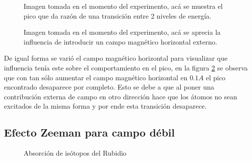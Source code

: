\documentclass[%
 reprint,
 amsmath,amssymb,
 aps,
]{revtex4-1}
\begin{document}
\begin{figure}[h]
\caption{\label{foto pico} Imagen tomada en el momento del experimento, acá se muestra el pico que da razón de una transición entre 2 niveles de energía.}
\end{figure}
\begin{figure}[h]
\caption{\label{foto muerto}  Imagen tomada en el momento del experimento, acá se aprecia la influencia de introducir un campo magnético horizontal externo.}
\end{figure}
De igual forma se varió el campo magnético horizontal para visualizar que influencia tenía este sobre el comportamiento en el pico, en la figura \ref{foto muerto} se observa que con tan sólo aumentar el campo magnético horizontal en $0.1 A$ el pico encontrado desaparece por completo. Esto se debe a que al poner una contribución externa de campo en otro dirección hace que los átomos no sean excitados de la misma forma y por ende esta transición desaparece.


\subsection{Efecto Zeeman para campo débil}

\begin{figure}[h]
\caption{Absorción de isótopos del Rubidio}
\label{absorcion}
\end{figure}
\end{document}
